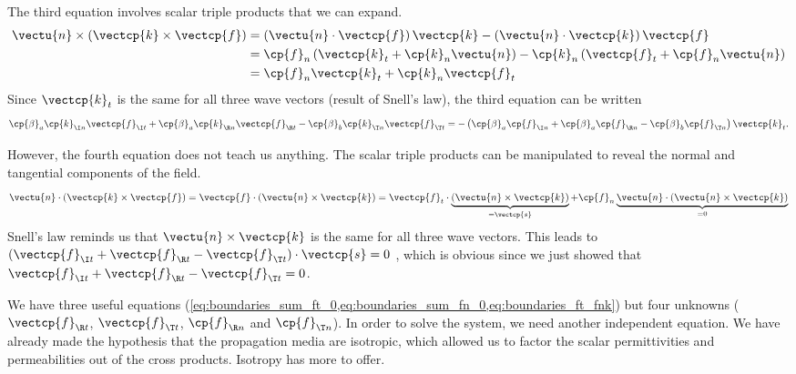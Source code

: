 The third equation involves scalar triple products that we can expand.
\begin{subequations}
    \begin{align}
        \vectu{n} \times \left( \vectcp{k} \times \vectcp{f} \right)
        &=
        \left( \vectu{n} \cdot \vectcp{f} \right) \vectcp{k}
        -
        \left( \vectu{n} \cdot \vectcp{k} \right) \vectcp{f}
        \\
        &=
        \cp{f}_n \left( \vectcp{k}_t + \cp{k}_n \vectu{n} \right)
        -
        \cp{k}_n \left( \vectcp{f}_t + \cp{f}_n \vectu{n} \right)
        \\
        &=
        \cp{f}_n \vectcp{k}_t + \cp{k}_n \vectcp{f}_t
    \end{align}
\end{subequations}
Since $\vectcp{k}_t$ is the same for all three wave vectors (result of Snell's law), the third equation can be written
\begin{equation}
    \cp{\beta}_a \cp{k}_{\I n} \vectcp{f}_{\I t}
    +
    \cp{\beta}_a \cp{k}_{\R n} \vectcp{f}_{\R t}
    -
    \cp{\beta}_b \cp{k}_{\T n} \vectcp{f}_{\T t}
    =
    -
    \left(
        \cp{\beta}_a \cp{f}_{\I n}
        +
        \cp{\beta}_a \cp{f}_{\R n}
        -
        \cp{\beta}_b \cp{f}_{\T n}
    \right)
    \vectcp{k}_t
    \text{.}
    \label{eq:boundaries_ft_fnk}
\end{equation}

However, the fourth equation does not teach us anything.
The scalar triple products can be manipulated to reveal the normal and tangential components of the field.
\begin{equation}
    \vectu{n} \cdot \left( \vectcp{k} \times \vectcp{f} \right)
    =
    \vectcp{f} \cdot \left( \vectu{n} \times \vectcp{k} \right)
    =
    \vectcp{f}_t
    \cdot
    \underbrace{
        \left( \vectu{n} \times \vectcp{k} \right)
    }_{= \vectcp{s}}
    +
    \cp{f}_n
    \underbrace{
        \vectu{n}
        \cdot
        \left( \vectu{n} \times \vectcp{k} \right)
    }_{=0}
\end{equation}
Snell's law reminds us that $\vectu{n} \times \vectcp{k}$ is the same for all three wave vectors.
This leads to
$( \vectcp{f}_{\I t} + \vectcp{f}_{\R t} - \vectcp{f}_{\T t})
 \cdot
 \vectcp{s}
 = 0
$%
, which is obvious since we just showed that $\vectcp{f}_{\I t} + \vectcp{f}_{\R t} - \vectcp{f}_{\T t} = 0$.

We have three useful equations
(\cref{eq:boundaries_sum_ft_0,eq:boundaries_sum_fn_0,eq:boundaries_ft_fnk}) but four unknowns ($\vectcp{f}_{\R t}$, $\vectcp{f}_{\T t}$, $\cp{f}_{\R n}$ and $\cp{f}_{\T n}$).
In order to solve the system, we need another independent equation.
We have already made the hypothesis that the propagation media are isotropic, which allowed us to factor the scalar permittivities and permeabilities out of the cross products.
Isotropy has more to offer.



